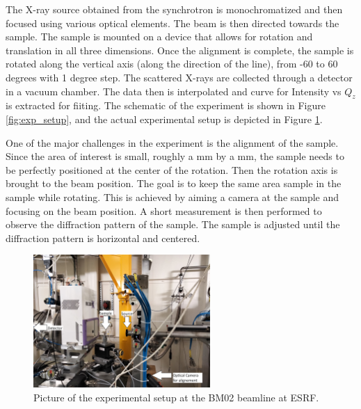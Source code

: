 The X-ray source obtained from the synchrotron is monochromatized and then focused using
various optical elements. The beam is then directed towards the sample. The 
sample is mounted on a device that allows for rotation and translation in all 
three dimensions. Once the alignment is complete, the sample is rotated along the vertical axis (along the direction of the line), from -60
to 60 degrees with 1 degree step. The scattered X-rays are collected through a detector in a 
vacuum chamber. The data then is interpolated and curve for Intensity vs $Q_{z}$ is extracted for fiiting. The schematic of the experiment is shown in Figure \ref{fig:exp_setup},
and the actual experimental setup is depicted in Figure \ref{fig:exp_setup_real}.

\medskip

One of the major challenges in the experiment is the alignment of the sample. Since the area of interest is small, roughly a mm by a mm,
the sample needs to be perfectly positioned at the center of the rotation. Then the rotation axis is brought to the beam position. 
The goal is to keep the same area sample in the sample while rotating. This is achieved by 
aiming a camera at the sample and focusing on the beam position. A short measurement is then performed to observe the diffraction pattern of the sample.
The sample is adjusted until the diffraction pattern is horizontal and centered.

\begin{figure}[h]
\centering
\includegraphics[width=0.6\textwidth]{images/photo_exp.jpg}
\caption{Picture of the experimental setup at the BM02 beamline at ESRF.}
\label{fig:exp_setup_real}
\end{figure}%

